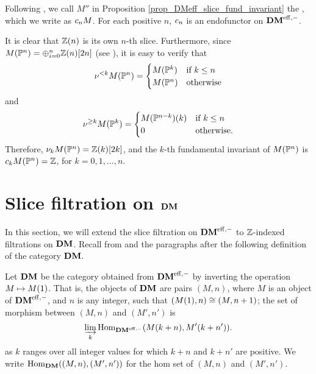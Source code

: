 \begin{defn}\label{def_DM_fund_invariant}
Following \loccit, we call $M''$ in Proposition
\ref{prop_DMeff_slice_fund_invariant} the , which we write as $\fIDM{n}M$. For each positive 
$n$, $\fIDM{n}$ is an endofunctor on $\DMeff$.
\end{defn}

\begin{ex}\label{ex_sfilt_MPn}
It is clear that $\Z(n)$ is its own $n$-th slice. Furthermore,
since $M(\P^n) = \oplus_{i = 0}^n \Z(n)[2n]$ (see 
\cite[15.5]{MVW}), it is easy to verify that 
\[
\slDM{k}M(\P^n) = \begin{cases}
M(\P^k) & \textrm{if }k \leq n \\
M(\P^n) & \textrm{otherwise}
\end{cases}
\]
and 
\[
\sgDM{k}M(\P^k) = \begin{cases}
\tZ[k]{M(\P^{n - k})} & \textrm{if }k \leq n\\
0 & \textrm{otherwise}.
\end{cases}
\]
Therefore, $\sliceDM{k} M(\P^n) = \Z(k)[2k]$, and the $k$-th
fundamental invariant of $M(\P^n)$ is $\fIDM{k}M(\P^n) = \Z$,
for $k = 0,1,\dots,n$.
\end{ex}

\section{Slice filtration on $\DM$}
\label{sect_slice_filt_on_DM}

In this section, we will extend the slice filtration on $\DMeff$ 
to $\Z$-indexed filtrations on $\DM$. Recall from \cite[9.7]{MVW}
and the paragraphs after \cite[14.2]{MVW} the following definition
of the category $\DM$.

\begin{defn}
Let $\DM$ be the category obtained from $\DMeff$ by inverting
the operation $M \mapsto \tZ{M}$. That is, the objects of $\DM$
are pairs $(M, n)$, where $M$ is an object of $\DMeff$, and $n$
is any integer, such that $(\tZ{M}, n) \cong (M, n + 1)$; the set 
of morphism between $(M, n)$ and $(M', n')$ is 
\[
\varinjlim_{k} \homDMf(\tZ[k + n]{M}, \tZ[k + n']{M'}).
\]
as $k$ ranges over all integer values for which $k + n$ and 
$k + n'$ are positive. We write $\homDM((M, n), (M',n'))$ for the 
hom set of $(M, n)$ and $(M', n')$. 
\end{defn}

